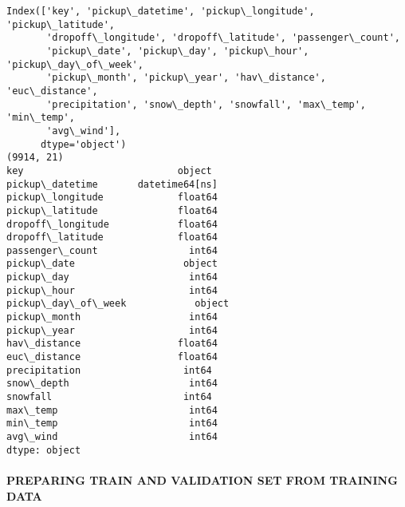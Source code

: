 \documentclass[11pt]{article}
\begin{document}
    \begin{Verbatim}[commandchars=\\\{\}]
Index(['key', 'pickup\_datetime', 'pickup\_longitude', 'pickup\_latitude',
       'dropoff\_longitude', 'dropoff\_latitude', 'passenger\_count',
       'pickup\_date', 'pickup\_day', 'pickup\_hour', 'pickup\_day\_of\_week',
       'pickup\_month', 'pickup\_year', 'hav\_distance', 'euc\_distance',
       'precipitation', 'snow\_depth', 'snowfall', 'max\_temp', 'min\_temp',
       'avg\_wind'],
      dtype='object')
(9914, 21)
key                           object
pickup\_datetime       datetime64[ns]
pickup\_longitude             float64
pickup\_latitude              float64
dropoff\_longitude            float64
dropoff\_latitude             float64
passenger\_count                int64
pickup\_date                   object
pickup\_day                     int64
pickup\_hour                    int64
pickup\_day\_of\_week            object
pickup\_month                   int64
pickup\_year                    int64
hav\_distance                 float64
euc\_distance                 float64
precipitation                  int64
snow\_depth                     int64
snowfall                       int64
max\_temp                       int64
min\_temp                       int64
avg\_wind                       int64
dtype: object

    \end{Verbatim}

    \paragraph{PREPARING TRAIN AND VALIDATION SET FROM TRAINING
DATA}\label{preparing-train-and-validation-set-from-training-data}
\end{document}
